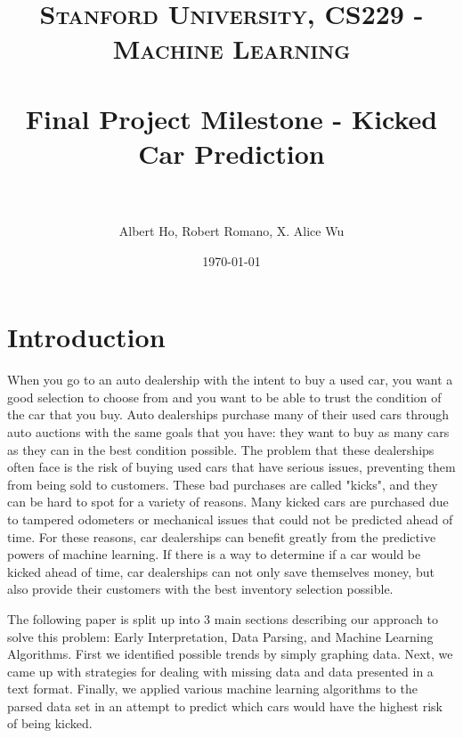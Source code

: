 \documentclass[paper=letter, fontsize=11pt]{scrartcl} %
\title{	
\normalfont \normalsize 
\textsc{Stanford University, CS229 - Machine Learning} \\ [25pt] %
\horrule{0.5pt} \\[0.4cm] %
\huge Final Project Milestone - Kicked Car Prediction \\ %
\horrule{2pt} \\[0.3cm] %
}
\author{Albert Ho, Robert Romano, X. Alice Wu} %
\date{\normalsize\today} %
\numberwithin{equation}{section} %
\begin{document}
\noindent
\maketitle %

\section{Introduction}
	When you go to an auto dealership with the intent to buy a used car, you want a good selection to choose from and you want to be able to trust the condition of the car that you buy. Auto dealerships purchase many of their used cars through auto auctions with the same goals that you have: they want to buy as many cars as they can in the best condition possible. The problem that these dealerships often face is the risk of buying used cars that have serious issues, preventing them from being sold to customers. These bad purchases are called "kicks", and they can be hard to spot for a variety of reasons. Many kicked cars are purchased due to tampered odometers or mechanical issues that could not be predicted ahead of time. For these reasons, car dealerships can benefit greatly from the predictive powers of machine learning. If there is a way to determine if a car would be kicked ahead of time, car dealerships can not only save themselves money, but also provide their customers with the best inventory selection possible.

	The following paper is split up into 3 main sections describing our approach to solve this problem: Early Interpretation, Data Parsing, and Machine Learning Algorithms. First we identified possible trends by simply graphing data. Next, we came up with strategies for dealing with missing data and data presented in a text format. Finally, we applied various machine learning algorithms to the parsed data set in an attempt to predict which cars would have the highest risk of being kicked.
\end{document}
